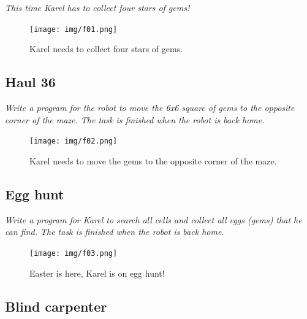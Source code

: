 {\em This time Karel has to collect four stars of gems!}\\[-8mm]

\begin{figure}[!ht]
\begin{center}
\texttt{[image: img/f01.png]}
\end{center}
\vspace{-4mm}
\caption{Karel needs to collect four stars of gems.}
\label{fig:f01}
\vspace{-10mm}
\end{figure}
\newpage



\subsection{Haul 36}

{\em Write a program for the robot to move the 6x6 square of gems to the 
opposite corner of the maze. The task is finished when the robot is back home.}

\begin{figure}[!ht]
\begin{center}
\texttt{[image: img/f02.png]}
\end{center}
\vspace{-4mm}
\caption{Karel needs to move the gems to the opposite corner of the maze.}
\label{fig:f02}
\end{figure}
\vspace{-1cm}



\subsection{Egg hunt}

{\em Write a program for Karel to search all cells and collect all eggs (gems) that he can find. The task is finished when the robot is back home.}


\begin{figure}[!ht]
\begin{center}
\texttt{[image: img/f03.png]}
\end{center}
\vspace{-4mm}
\caption{Easter is here, Karel is on egg hunt!}
\vspace{-1cm}
\label{fig:f03}
\end{figure}
\newpage


\subsection{Blind carpenter}

